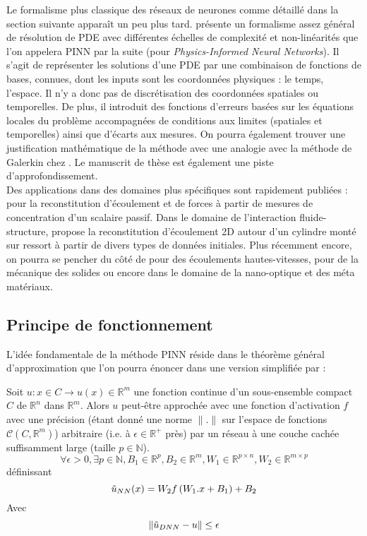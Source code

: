 Le formalisme plus classique des réseaux de neurones comme détaillé dans la section suivante apparaît un peu plus tard. \cite{raissiPhysicsinformedNeuralNetworks2019} présente un formalisme assez général de résolution de PDE avec différentes échelles de complexité et non-linéarités que l'on appelera PINN par la suite (pour \textit{Physics-Informed Neural Networks}). Il s'agit de représenter les solutions d'une PDE par une combinaison de fonctions de bases, connues, dont les inputs sont les coordonnées physiques : le temps, l'espace. Il n'y a donc pas de discrétisation des coordonnées spatiales ou temporelles. De plus, il introduit des fonctions d'erreurs basées sur les équations locales du problème accompagnées de conditions aux limites (spatiales et temporelles) ainsi que d'écarts aux mesures. On pourra également trouver une justification mathématique de la méthode avec une analogie avec la méthode de Galerkin chez \cite{al-aradiSolvingNonlinearHighDimensional}. Le manuscrit de thèse \cite{rudyComputationalMethodsSystem2019} est également une piste d'approfondissement.\\

Des applications dans des domaines plus spécifiques sont rapidement publiées : \cite{raissiHiddenFluidMechanics2018} pour la reconstitution d'écoulement et de forces à partir de mesures de concentration d'un scalaire passif. Dans le domaine de l'interaction fluide-structure, \cite{raissiDeepLearningVortexinduced2019a} propose la reconstitution d'écoulement 2D autour d'un cylindre monté sur ressort à partir de divers types de données initiales. Plus récemment encore, on pourra se pencher du côté de \cite{maoPhysicsinformedNeuralNetworks2020} pour des écoulements hautes-vitesses, \cite{haghighatDeepLearningFramework2020,luExtractionMechanicalProperties2020} pour de la mécanique des solides ou encore \cite{chenPhysicsinformedNeuralNetworks2020} dans le domaine de la nano-optique et des méta matériaux.\


\subsection{Principe de fonctionnement}

L'idée fondamentale de la méthode PINN réside dans le théorème général d'approximation \cite{hornikMultilayerFeedforwardNetworks1989} que l'on pourra énoncer dans une version simplifiée par : 

\begin{theorem}
Soit $u : x\in  C \rightarrow u(x) \in \mathbb{R}^m$ une fonction continue d'un sous-ensemble compact $C$ de $\mathbb{R}^n$ dans $\mathbb{R}^m$. Alors $u$ peut-être approchée avec une fonction d'activation $f$ avec une précision (étant donné une norme $\|.\|$ sur l'espace de fonctions $\mathcal{C}(C,\mathbb{R}^m)$) arbitraire (i.e. à $\epsilon \in \mathbb{R}^+$ près) par un réseau à une couche cachée suffisamment large (taille $p\in \mathbb{N}$).
$$ \forall \epsilon > 0, \exists p\in \mathbb{N}, B_1 \in \mathbb{R}^p, B_2 \in \mathbb{R}^m, W_1 \in \mathbb{R}^{p\times n}, W_2 \in \mathbb{R}^{m \times p} $$
définissant
$$ \Tilde{u}_{NN} (x) = W_2 f\left( W_1 . x + B_1  \right) + B_2 $$
Avec 
$$ \| \Tilde{u}_{DNN} - u \| \leq \epsilon $$
\end{theorem}

